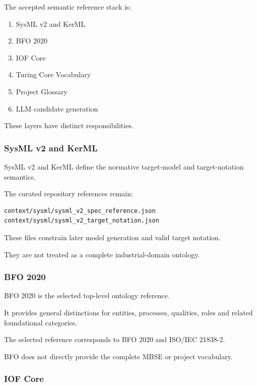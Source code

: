 The accepted semantic reference stack is:

\begin{enumerate}
\def\labelenumi{\arabic{enumi}.}
\tightlist
\item
  SysML v2 and KerML
\item
  BFO 2020
\item
  IOF Core
\item
  Turing Core Vocabulary
\item
  Project Glossary
\item
  LLM candidate generation
\end{enumerate}

These layers have distinct responsibilities.

\hypertarget{sysml-v2-and-kerml}{%
\subsubsection{SysML v2 and KerML}\label{sysml-v2-and-kerml}}

SysML v2 and KerML define the normative target-model and target-notation semantics.

The curated repository references remain:

\begin{verbatim}
context/sysml/sysml_v2_spec_reference.json
context/sysml/sysml_v2_target_notation.json
\end{verbatim}

These files constrain later model generation and valid target notation.

They are not treated as a complete industrial-domain ontology.

\hypertarget{bfo-2020}{%
\subsubsection{BFO 2020}\label{bfo-2020}}

BFO 2020 is the selected top-level ontology reference.

It provides general distinctions for entities, processes, qualities, roles and related foundational categories.

The selected reference corresponds to BFO 2020 and ISO/IEC 21838-2.

BFO does not directly provide the complete MBSE or project vocabulary.

\hypertarget{iof-core}{%
\subsubsection{IOF Core}\label{iof-core}}

